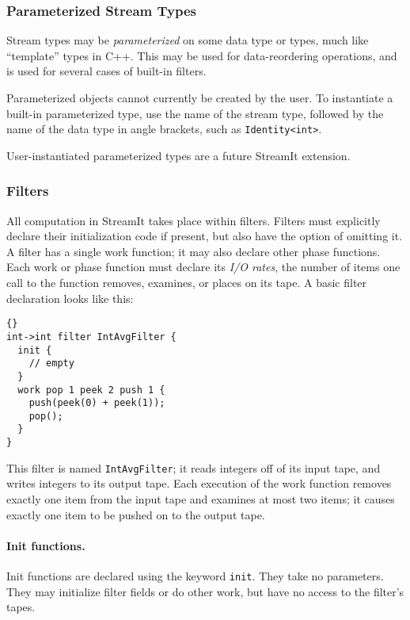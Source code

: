 \documentclass[11pt]{article}
\begin{document}
\subsubsection{Parameterized Stream Types}

Stream types may be \emph{parameterized} on some data type or types,
much like ``template'' types in C++.  This may be used for
data-reordering operations, and is used for several cases of built-in
filters.

Parameterized objects cannot currently be created by the user.  To
instantiate a built-in parameterized type, use the name of the stream
type, followed by the name of the data type in angle brackets, such as
\lstinline|Identity<int>|.

\begin{note}
User-instantiated parameterized types are a future StreamIt
extension.
\end{note}

\subsubsection{Filters}

All computation in StreamIt takes place within filters.  Filters must
explicitly declare their initialization code if present, but also have
the option of omitting it.  A filter has a single work function; it
may also declare other phase functions.  Each work or phase function
must declare its \emph{I/O rates}, the number of items one call to the
function removes, examines, or places on its tape.  A basic filter
declaration looks like this:

\begin{lstlisting}{}
int->int filter IntAvgFilter {
  init {
    // empty
  }
  work pop 1 peek 2 push 1 {
    push(peek(0) + peek(1));
    pop();
  }
}
\end{lstlisting}

This filter is named \lstinline|IntAvgFilter|; it reads integers off of its
input tape, and writes integers to its output tape.  Each execution of
the work function removes exactly one item from the input tape and
examines at most two items; it causes exactly one item to be pushed on
to the output tape.

\paragraph{Init functions.}  Init functions are declared using the
keyword \lstinline|init|.  They take no parameters.  They may initialize
filter fields or do other work, but have no access to the filter's
tapes.
\end{document}
